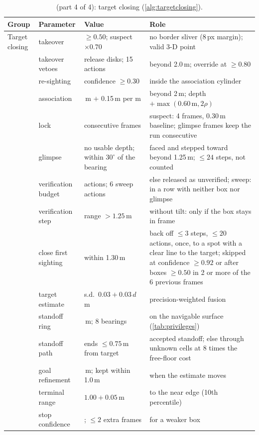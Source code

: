 \documentclass[10pt]{article}
\begin{document}
\begin{table}[p]
\centering
\small
\caption*{ (part 4 of 4): target closing (\cref{alg:targetclosing}).}
\begin{tabular}{@{}>{\raggedright\arraybackslash}p{1.9cm}>{\raggedright\arraybackslash}p{3.1cm}>{\raggedright\arraybackslash}p{3.8cm}>{\raggedright\arraybackslash}p{5.6cm}@{}}
\toprule
Group & Parameter & Value & Role \\
\midrule
Target closing & takeover & $\ge 0.50$; suspect $\times 0.70$ & no border sliver (8\,px margin); valid 3-D point \\
 & takeover vetoes & release disks; 15 actions & beyond 2.0\,m; override at $\ge 0.80$ \\
 & re-sighting & confidence $\ge 0.30$ & inside the association cylinder \\
 & association & 0.50\,m $+$ 0.15\,m per m & beyond 2\,m; depth $+\max(0.60\,\text{m}, 2\rho)$ \\
 & lock & 2 consecutive frames & suspect: 4 frames, 0.30\,m baseline; glimpse frames keep the run consecutive \\
 & glimpse & no usable depth; within $30^\circ$ of the bearing & faced and stepped toward beyond 1.25\,m; $\le 24$ steps, not counted \\
 & verification budget & 12 actions; 6 sweep actions & else released as unverified; sweep: in a row with neither box nor glimpse \\
 & verification step & range $> 1.25$\,m & without tilt: only if the box stays in frame \\
 & close first sighting & within 1.30\,m & back off $\le 3$ steps, $\le 20$ actions, once, to a spot with a clear line to the target; skipped at confidence $\ge 0.92$ or after boxes $\ge 0.50$ in 2 or more of the 6 previous frames \\
 & target estimate & s.d.\ $0.03 + 0.03\,d$\,m & precision-weighted fusion \\
 & standoff ring & 0.65\,m; 8 bearings & on the navigable surface (\cref{tab:privileges}) \\
 & standoff path & ends $\le 0.75$\,m from target & accepted standoff; else through unknown cells at 8 times the free-floor cost \\
 & goal refinement & 0.15\,m; kept within 1.0\,m & when the estimate moves \\
 & terminal range & $1.00 + 0.05$\,m & to the near edge (10th percentile) \\
 & stop confidence & 0.50; $\le 2$ extra frames & for a weaker box \\

\end{tabular}
\end{table}
\end{document}
